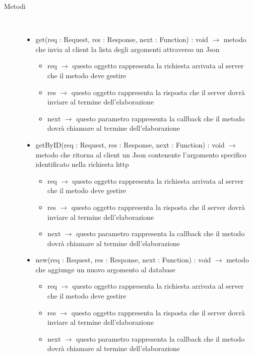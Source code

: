 \begin{description}
\item[Metodi] \hfill \\
\vspace{-7mm}
\begin{itemize}
	\item get(req : Request, res : Response, next : Function) : void $\rightarrow$ metodo che invia al client la lista degli argomenti attraverso un Json\begin{itemize}
		\item req $\rightarrow$ questo oggetto rappresenta la richiesta arrivata al server che il metodo deve gestire
		\item res $\rightarrow$ questo oggetto rappresenta la risposta che il server dovrà inviare al termine dell'elaborazione
		\item next $\rightarrow$ questo parametro rappresenta la callback che il metodo dovrà chiamare al termine dell’elaborazione
	\end{itemize}
	
	\item getByID(req : Request, res : Response, next : Function) : void $\rightarrow$ metodo che ritorna al client un Json contenente l'argomento specifico identificato nella richiesta http\begin{itemize}
		\item req $\rightarrow$ questo oggetto rappresenta la richiesta arrivata al server che il metodo deve gestire
		\item res $\rightarrow$ questo oggetto rappresenta la risposta che il server dovrà inviare al termine dell'elaborazione
		\item next $\rightarrow$ questo parametro rappresenta la callback che il metodo dovrà chiamare al termine dell’elaborazione
	\end{itemize}
	
	\item new(req : Request, res : Response, next : Function) : void $\rightarrow$ metodo che aggiunge un nuovo argomento al database\begin{itemize}
		\item req $\rightarrow$ questo oggetto rappresenta la richiesta arrivata al server che il metodo deve gestire
		\item res $\rightarrow$ questo oggetto rappresenta la risposta che il server dovrà inviare al termine dell'elaborazione
		\item next $\rightarrow$ questo parametro rappresenta la callback che il metodo dovrà chiamare al termine dell’elaborazione
	\end{itemize}
	

\end{itemize}
\end{description}
